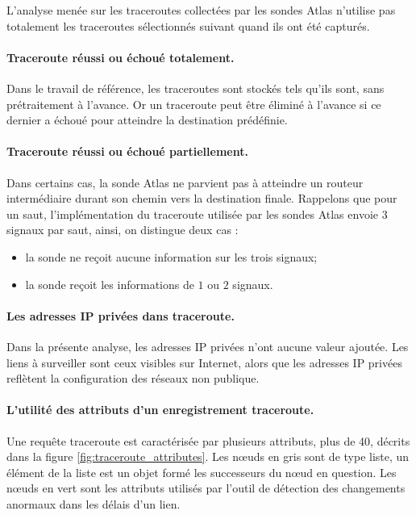 L'analyse menée sur les traceroutes collectées par les sondes Atlas n'utilise pas totalement les traceroutes sélectionnés suivant quand ils ont été capturés. 

\paragraph{Traceroute réussi ou échoué totalement.} Dans le travail de référence, les traceroutes sont stockés tels qu'ils sont, sans prétraitement à l'avance. Or un traceroute peut être éliminé à l'avance si ce dernier a échoué pour atteindre la destination prédéfinie. 


\paragraph{Traceroute réussi ou échoué partiellement.} Dans certains cas, la sonde Atlas ne parvient pas à atteindre un routeur intermédiaire durant son chemin vers la destination finale. Rappelons que pour un saut, l'implémentation du traceroute utilisée par les sondes Atlas envoie $3$ signaux par saut,  ainsi, on distingue deux cas : 
\begin{itemize}
	\item  la sonde ne reçoit aucune information sur les trois signaux;
	\item la sonde reçoit les informations de $1$ ou $2$ signaux.
\end{itemize}


\paragraph{Les adresses IP privées dans traceroute.} Dans la présente analyse, les adresses IP privées n'ont  aucune valeur ajoutée. Les liens à surveiller sont ceux visibles sur Internet, alors que les adresses IP privées reflètent la configuration des réseaux non publique.



\paragraph{L'utilité des attributs d'un enregistrement traceroute.} Une requête  traceroute est caractérisée par plusieurs attributs, plus de 40, décrits dans la figure \ref{fig:traceroute_attributes}. Les n\oe{}uds en gris sont de type liste, un élément de la liste est un objet formé les successeurs du n\oe{}ud en question. Les n\oe{}uds en vert sont les attributs utilisés par l'outil de détection des changements anormaux dans les délais d'un lien.


